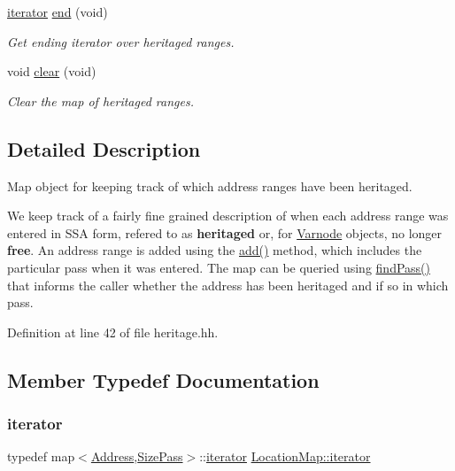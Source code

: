\begin{DoxyCompactItemize}
\mbox{\hyperlink{class_location_map_a13612b4d0583b85205f3ad6476c2aef9}{iterator}} \mbox{\hyperlink{class_location_map_a9d4bddedee005e780986d9752b93e4f0}{end}} (void)
\begin{DoxyCompactList}\small\item\em Get ending iterator over heritaged ranges. \end{DoxyCompactList}\item 
void \mbox{\hyperlink{class_location_map_a76bf666b4ad4b511cfd0290b9b04aa72}{clear}} (void)
\begin{DoxyCompactList}\small\item\em Clear the map of heritaged ranges. \end{DoxyCompactList}\end{DoxyCompactItemize}


\subsection{Detailed Description}
Map object for keeping track of which address ranges have been heritaged. 

We keep track of a fairly fine grained description of when each address range was entered in S\+SA form, refered to as {\bfseries{heritaged}} or, for \mbox{\hyperlink{class_varnode}{Varnode}} objects, no longer {\bfseries{free}}. An address range is added using the \mbox{\hyperlink{class_location_map_a72014909f852e240636856c3fec0ca04}{add()}} method, which includes the particular pass when it was entered. The map can be queried using \mbox{\hyperlink{class_location_map_aa4e4c0f548533f8607a706cf7796c789}{find\+Pass()}} that informs the caller whether the address has been heritaged and if so in which pass. 

Definition at line 42 of file heritage.\+hh.



\subsection{Member Typedef Documentation}
\mbox{\label{class_location_map_a13612b4d0583b85205f3ad6476c2aef9}} 
\subsubsection{\texorpdfstring{iterator}{iterator}}
{\footnotesize\ttfamily typedef map$<$\mbox{\hyperlink{class_address}{Address}},\mbox{\hyperlink{struct_size_pass}{Size\+Pass}}$>$\+::\mbox{\hyperlink{class_location_map_a13612b4d0583b85205f3ad6476c2aef9}{iterator}} \mbox{\hyperlink{class_location_map_a13612b4d0583b85205f3ad6476c2aef9}{Location\+Map\+::iterator}}}



